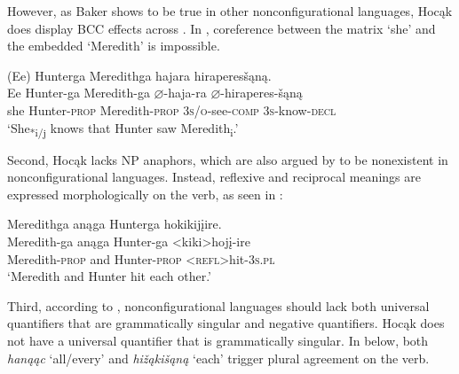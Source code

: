 \documentclass[output=paper]{LSP/langsci}
\begin{document}
However, as Baker shows to be true in other nonconfigurational languages, Hocąk does display BCC effects across . In , coreference between the matrix  `she' and the embedded  `Meredith' is impossible.
 
\begin{exe}
\ex\label{ex:jrs:17}	
\glll (Ee) 	Hunterga 	Meredithga		hajara 						hiraperes\v{s}ąną. \\
 Ee 		Hunter-ga 	Meredith-ga 		$\varnothing$-haja-ra 				$\varnothing$-hiraperes-\v{s}ąną \\
she 		Hunter-\textsc{prop} 	Meredith-\textsc{prop} 	\textsc{3s/o}-see-\textsc{comp} 	\textsc{3s}-know-\textsc{decl}  \\
\trans `She\textsubscript{*i/j} knows that Hunter saw Meredith\textsubscript{i}.'
\end{exe}	

 
Second, Hocąk lacks NP anaphors, which are also argued by \citet{Baker1996} to be nonexistent in nonconfigurational languages. Instead, reflexive and reciprocal meanings are expressed morphologically on the verb, as seen in :
 
\begin{exe}
\ex\label{ex:jrs:18} 
\glll Meredithga		anąga 	Hunterga 			hokikij\k{i}ire.\\
Meredith-ga	 	anąga 	Hunter-ga 			<kiki>hoj\k{i}-ire \\
Meredith-\textsc{prop} and 		Hunter-\textsc{prop} 	<\textsc{refl}>hit-\textsc{3s.pl} \\
\trans `Meredith and Hunter hit each other.'
\end{exe}
	
 
Third, according to \citet{Baker1996}, nonconfigurational languages should lack both universal quantifiers that are grammatically singular and negative quantifiers. Hocąk does not have a universal quantifier that is grammatically singular.  In  below, both \textit{hanąąc} `all/every' and \textit{hi\v{z}ąki\v{s}ąną} `each' trigger plural agreement on the verb.
 
\end{document}
